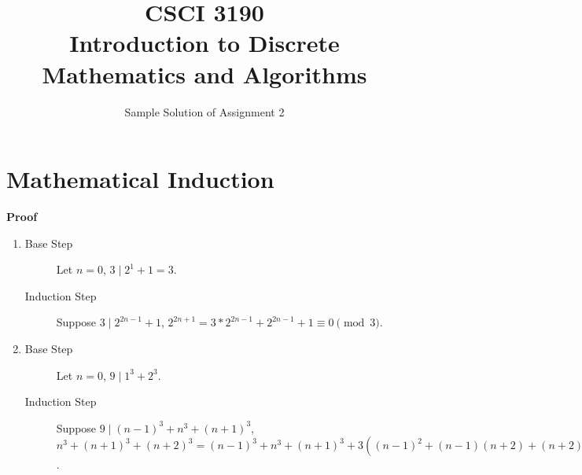 \documentclass{../../cls/sig-alternate-05-2015}
\begin{document}






%

\title{CSCI 3190 \\ Introduction to Discrete Mathematics and Algorithms}
\subtitle{Sample Solution of Assignment 2}

\maketitle
\begin{abstract}

\end{abstract}

\keywords{}

\section{Mathematical Induction}
\textbf{Proof}\begin{enumerate}[label=(\alph*)]
	\item \begin{description}
		\item[Base Step] Let $n = 0$, $3 \mid 2^1 + 1 = 3$.
		\item[Induction Step] Suppose $3 \mid 2^{2n - 1} + 1$, $2^{2n + 1} = 3 * 2^{2n - 1} + 2^{2n - 1} + 1 \equiv 0 \pmod{3}$.
	\end{description}
	\item \begin{description}
		\item[Base Step] Let $n = 0$, $9 \mid 1^3 + 2^3$.
		\item[Induction Step] Suppose $9 \mid (n - 1)^3 + n^3 + (n + 1)^3$, $n^3 + (n + 1)^3 + (n + 2)^3 = (n - 1)^3 + n^3 + (n + 1)^3 + 3((n - 1)^2 + (n - 1)(n + 2) + (n + 2)^2) = (n - 1)^3 + n^3 + (n + 1)^3 + 9(n^2 + n + 1) \equiv 0 \pmod{9}$.
	\end{description}
\end{enumerate}
\end{document}
